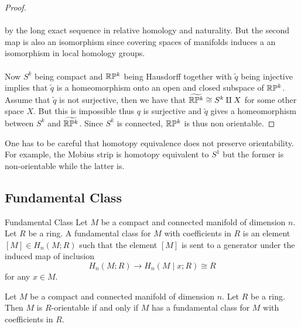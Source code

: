 \documentclass[a4paper]{article}
\begin{document}
\begin{prp}{}{}
\begin{proof}
\\~\\
by the long exact sequence in relative homology and naturality. But the second map is also an isomorphism since covering spaces of manifolds induces a an isomorphism in local homology groups. \\~\\

Now $S^k$ being compact and $\mathbb{R}\mathbb{P}^k$ being Hausdorff together with $\tilde{q}$ being injective implies that $\tilde{q}$ is a homeomorphism onto an open and closed subspace of $\mathbb{R}\mathbb{P}^k$. Assume that $\tilde{q}$ is not surjective, then we have that $\widetilde{\mathbb{R}\mathbb{P}^k}\cong S^k\amalg X$ for some other space $X$. But this is impossible thus $q$ is surjective and $\tilde{q}$ gives a homeomorphism between $S^k$ and $\widetilde{\mathbb{R}\mathbb{P}^k}$. Since $S^k$ is connected, $\mathbb{R}\mathbb{P}^k$ is thus non orientable. 
\end{proof}
\end{prp}

One has to be careful that homotopy equivalence does not preserve orientability. For example, the Mobius strip is homotopy equivalent to $S^1$ but the former is non-orientable while the latter is. 

\subsection{Fundamental Class}
\begin{defn}{Fundamental Class}{} Let $M$ be a compact and connected manifold of dimension $n$. Let $R$ be a ring. A fundamental class for $M$ with coefficients in $R$ is an element $[M]\in H_n(M;R)$ such that the element $[M]$ is sent to a generator under the induced map of inclusion $$H_n(M;R)\to H_n(M\;|\;x;R)\cong R$$ for any $x\in M$. 
\end{defn}

\begin{lmm}{}{} Let $M$ be a compact and connected manifold of dimension $n$. Let $R$ be a ring. Then $M$ is $R$-orientable if and only if $M$ has a fundamental class for $M$ with coefficients in $R$. 
\end{lmm}
\end{document}
